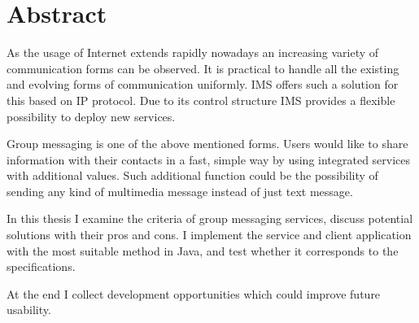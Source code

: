 
\section*{Abstract}

\nonfrenchspacing

As the usage of Internet extends rapidly nowadays an increasing variety of communication forms can be observed. It is practical to handle all the existing and evolving forms of communication uniformly. IMS offers such a solution for this based on IP protocol. Due to its control structure IMS provides a flexible possibility to deploy new services. 

Group messaging is one of the above mentioned forms. Users would like to share information with their contacts in a fast, simple way by using integrated services with additional values. Such additional function could be the possibility of sending any kind of multimedia message instead of just text message.

In this thesis I examine the criteria of group messaging services, discuss potential solutions with their pros and cons. I implement the service and client application with the most suitable method in Java, and test whether it corresponds to the specifications.

At the end I collect development opportunities which could improve future usability.

\frenchspacing
